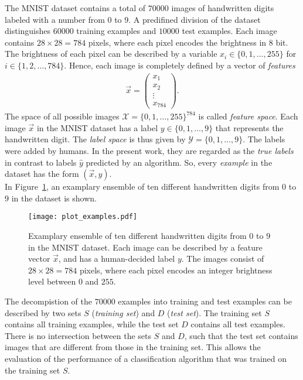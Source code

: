 The MNIST dataset contains a total of $70000$ images of handwritten digits labeled with a number from $0$ to $9$. A predifined division of the dataset distinguishes $60000$ training examples and $10000$ test examples. Each image contains $28 \times 28 = 784$ pixels, where each pixel encodes the brightness in $8$ bit. The brightness of each pixel can be described by a variable $x_i \in \{0, 1, \dots, 255\}$ for $i \in \{1, 2, \dots, 784\}$. Hence, each image is completely defined by a vector of \textit{features}
\begin{align}\label{eq:vector}
\vec{x} = 
\begin{pmatrix}
x_1\\
x_2\\
\vdots\\
x_{784}
\end{pmatrix}.
\end{align}
The space of all possible images $\mathcal{X} = \{0, 1, \dots, 255\}^{784}$ is called \textit{feature space}. Each image $\vec{x}$ in the MNIST dataset has a label $y \in \{0, 1, \dots, 9\}$ that represents the handwritten digit. The \textit{label space} is thus given by $\mathcal{Y} = \{0, 1, \dots, 9\}$. The labels were added by humans. In the present work, they are regarded as the \textit{true labels} in contrast to labels $\hat{y}$ predicted by an algorithm. So, every \textit{example} in the dataset has the form $(\vec{x}, y)$.\\

In Figure~\ref{fig:plot_examples}, an examplary ensemble of ten different handwritten digits from $0$ to $9$ in the dataset is shown. 

\begin{figure}[h!]
\texttt{[image: plot\_examples.pdf]}
\caption{Examplary ensemble of ten different handwritten digits from $0$ to $9$ in the MNIST dataset. Each image can be described by a feature vector $\vec{x}$, and has a human-decided label $y$. The images consist of $28 \times 28 = 784$ pixels, where each pixel encodes an integer brightness level between $0$ and $255$.}
\label{fig:plot_examples}
\end{figure}

The decompistion of the $70000$ examples into training and test examples can be described by two sets $S$ (\textit{training set}) and $D$ (\textit{test set}). The training set $S$ contains all training examples, while the test set $D$ contains all test examples. There is no intersection between the sets $S$ and $D$, such that the test set contains images that are different from those in the training set. This allows the evaluation of the performance of a classification algorithm that was trained on the training set $S$.
\newpage

